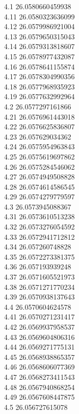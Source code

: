 {4.1	26.0580660459938\\
4.11	26.0580323636099\\
4.12	26.0579986921004\\
4.13	26.0579650315043\\
4.14	26.0579313818607\\
4.15	26.0578977432087\\
4.16	26.0578641155874\\
4.17	26.0578304990356\\
4.18	26.0577968935923\\
4.19	26.0577632992964\\
4.2	26.0577297161866\\
4.21	26.0576961443018\\
4.22	26.0576625836807\\
4.23	26.057629034362\\
4.24	26.0575954963843\\
4.25	26.0575619697862\\
4.26	26.0575284546062\\
4.27	26.0574949508828\\
4.28	26.0574614586545\\
4.29	26.0574279779597\\
4.3	26.0573945088367\\
4.31	26.0573610513238\\
4.32	26.0573276054592\\
4.33	26.0572941712812\\
4.34	26.057260748828\\
4.35	26.0572273381375\\
4.36	26.057193939248\\
4.37	26.0571605521973\\
4.38	26.0571271770234\\
4.39	26.0570938137643\\
4.4	26.0570604624578\\
4.41	26.0570271231417\\
4.42	26.0569937958537\\
4.43	26.0569604806316\\
4.44	26.0569271775131\\
4.45	26.0568938865357\\
4.46	26.0568606077369\\
4.47	26.0568273411543\\
4.48	26.0567940868254\\
4.49	26.0567608447875\\
4.5	26.056727615078\\
}
